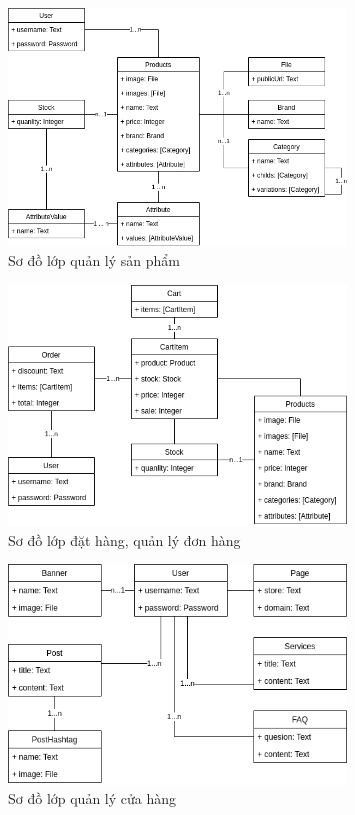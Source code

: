 \documentclass[11pt]{report}
\begin{document}
\FloatBarrier
\begin{figure}[!htbp]\fontsize{13px}{13px}\selectfont
	\centering
	\includegraphics[width=0.8\textwidth]{class-products}
	\caption{Sơ đồ lớp quản lý sản phẩm}
\end{figure}

\clearpage
\FloatBarrier
\begin{figure}[!htbp]\fontsize{13px}{13px}\selectfont
	\centering
	\includegraphics[width=0.8\textwidth]{class-orders}
	\caption{Sơ đồ lớp đặt hàng, quản lý đơn hàng}
\end{figure}
\FloatBarrier
\begin{figure}[!htbp]\fontsize{13px}{13px}\selectfont
	\centering
	\includegraphics[width=0.8\textwidth]{class-store}
	\caption{Sơ đồ lớp quản lý cửa hàng}
\end{figure}
\end{document}
